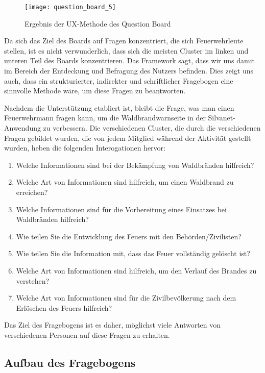 \begin{figure}[H]
  \centering
  \texttt{[image: question\_board\_5]}
  \caption{Ergebnis der UX-Methode des Question Board}
  \label{fig:question_board_5_not_appendix}
\end{figure}

Da sich das Ziel des Boards auf Fragen konzentriert, die sich Feuerwehrleute stellen, ist es nicht verwunderlich, dass sich die meisten Cluster im linken und unteren Teil des Boards konzentrieren.
Das Framework sagt, dass wir uns damit im Bereich der Entdeckung und Befragung des Nutzers befinden.
Dies zeigt uns auch, dass ein strukturierter, indirekter und schriftlicher Fragebogen eine sinnvolle Methode wäre, um diese Fragen zu beantworten\cite{customerQuestionBoard}.

Nachdem die Unterstützung etabliert ist, bleibt die Frage, was man einen Feuerwehrmann fragen kann, um die Waldbrandwarnseite in der Silvanet-Anwendung zu verbessern.
Die verschiedenen Cluster, die durch die verschiedenen Fragen gebildet wurden, die von jedem Mitglied während der Aktivität gestellt wurden, heben die folgenden Interogationen hervor:

\begin{enumerate}
  \item Welche Informationen sind bei der Bekämpfung von Waldbränden hilfreich?
  \item Welche Art von Informationen sind hilfreich, um einen Waldbrand zu erreichen?
  \item Welche Informationen sind für die Vorbereitung eines Einsatzes bei Waldbränden hilfreich?
  \item Wie teilen Sie die Entwicklung des Feuers mit den Behörden/Zivilisten?
  \item Wie teilen Sie die Information mit, dass das Feuer vollständig gelöscht ist?
  \item Welche Art von Informationen sind hilfreich, um den Verlauf des Brandes zu verstehen?
  \item Welche Art von Informationen sind für die Zivilbevölkerung nach dem Erlöschen des Feuers hilfreich?
\end{enumerate}

Das Ziel des Fragebogens ist es daher, möglichst viele Antworten von verschiedenen Personen auf diese Fragen zu erhalten.

\subsection{Aufbau des Fragebogens}

